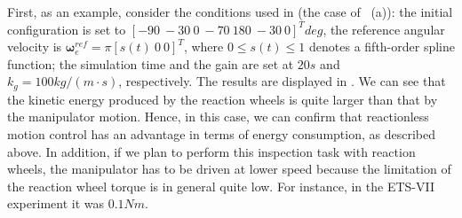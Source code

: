 %
First, as an example, consider the conditions used in  (the case of ~(a)):
the initial configuration is set to $[-90~-30~0~-70~180~-30~0]^{T}\unit{deg}$,
the reference angular velocity is $\bm{\omega}_{e}^{ref} = \pi[s(t)~0~0]^{T}$,
where $0 \leq s(t) \leq 1$ denotes a fifth-order spline function;
the simulation time and the gain are set at $20\unit{s}$ and $k_{g} = 100  \unit{kg/(m \cdot s)}$, respectively.
The results are displayed in .
We can see that the kinetic energy produced by the reaction wheels is quite larger than
that by the manipulator motion. Hence, in this case, we can confirm that reactionless motion 
control has an advantage in terms of energy consumption, as described above.
In addition,
if we plan to perform this inspection task with reaction wheels,
the manipulator has to be driven at lower speed because the limitation of the reaction wheel torque
is in general quite low. For instance, in the ETS-VII experiment it was  $0.1\unit{Nm}$.

